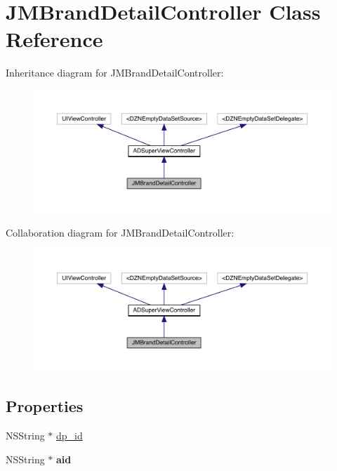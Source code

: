 \hypertarget{interface_j_m_brand_detail_controller}{}\section{J\+M\+Brand\+Detail\+Controller Class Reference}
\label{interface_j_m_brand_detail_controller}


Inheritance diagram for J\+M\+Brand\+Detail\+Controller\+:\nopagebreak
\begin{figure}[H]
\begin{center}
\leavevmode
\includegraphics[width=350pt]{interface_j_m_brand_detail_controller__inherit__graph}
\end{center}
\end{figure}


Collaboration diagram for J\+M\+Brand\+Detail\+Controller\+:\nopagebreak
\begin{figure}[H]
\begin{center}
\leavevmode
\includegraphics[width=350pt]{interface_j_m_brand_detail_controller__coll__graph}
\end{center}
\end{figure}
\subsection*{Properties}
\begin{DoxyCompactItemize}
\item 
N\+S\+String $\ast$ \mbox{\hyperlink{interface_j_m_brand_detail_controller_a4886727a1b629d880c0de0dbc82a54af}{dp\+\_\+id}}
\item 
\mbox{\label{interface_j_m_brand_detail_controller_ac5a501878a0612f5b56e9f065dbbe44d}} 
N\+S\+String $\ast$ {\bfseries aid}
\end{DoxyCompactItemize}
